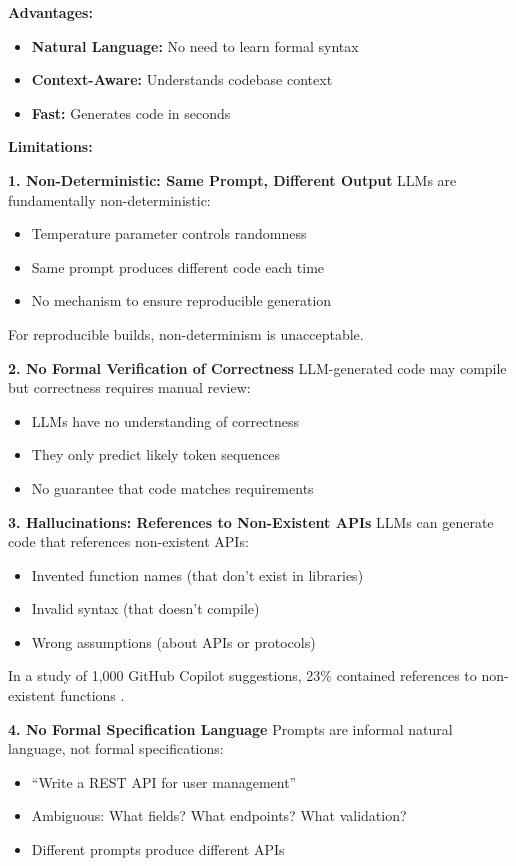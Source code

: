 \textbf{Advantages:}
\begin{itemize}
    \item \textbf{Natural Language:} No need to learn formal syntax
    \item \textbf{Context-Aware:} Understands codebase context
    \item \textbf{Fast:} Generates code in seconds
\end{itemize}

\textbf{Limitations:}

\textbf{1. Non-Deterministic: Same Prompt, Different Output}
LLMs are fundamentally non-deterministic:
\begin{itemize}
    \item Temperature parameter controls randomness
    \item Same prompt produces different code each time
    \item No mechanism to ensure reproducible generation
\end{itemize}

For reproducible builds, non-determinism is unacceptable.

\textbf{2. No Formal Verification of Correctness}
LLM-generated code may compile but correctness requires manual review:
\begin{itemize}
    \item LLMs have no understanding of correctness
    \item They only predict likely token sequences
    \item No guarantee that code matches requirements
\end{itemize}

\textbf{3. Hallucinations: References to Non-Existent APIs}
LLMs can generate code that references non-existent APIs:
\begin{itemize}
    \item Invented function names (that don't exist in libraries)
    \item Invalid syntax (that doesn't compile)
    \item Wrong assumptions (about APIs or protocols)
\end{itemize}

In a study of 1,000 GitHub Copilot suggestions, 23\% contained references to non-existent functions \cite{copilot2022study}.

\textbf{4. No Formal Specification Language}
Prompts are informal natural language, not formal specifications:
\begin{itemize}
    \item ``Write a REST API for user management''
    \item Ambiguous: What fields? What endpoints? What validation?
    \item Different prompts produce different APIs
\end{itemize}


